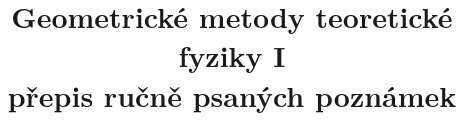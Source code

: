 \documentclass[11pt,a4paper]{article}
\title{\color{hlavni}Geometrické metody teoretické fyziky I\\[2pt]\large přepis ručně psaných poznámek}
\date{}
\begin{document}
\maketitle
\tableofcontents
\newpage


\newpage

\newpage

\newpage

\newpage

\newpage

\newpage

\newpage

\newpage

\newpage

\newpage

\newpage

\newpage

\newpage

\newpage

\newpage
\renewcommand{\arraystretch}{1}%

\newpage

\newpage

\end{document}
